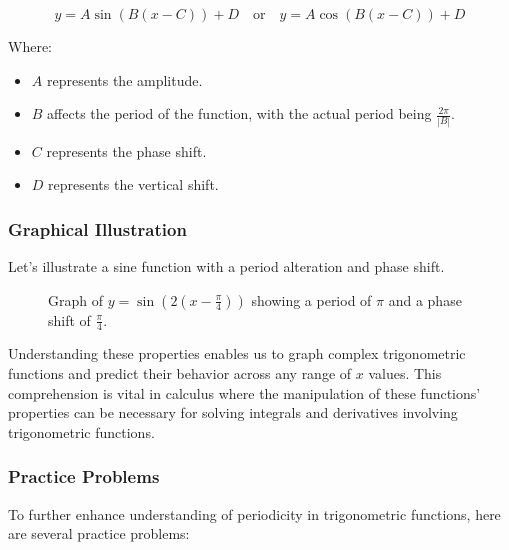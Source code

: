 \documentclass[a4paper,12pt]{book}
\newcounter{problem}
\begin{document}
\[ y = A \sin(B(x - C)) + D \quad \text{or} \quad y = A \cos(B(x - C)) + D \]

Where:
\begin{itemize}
    \item \( A \) represents the amplitude.
    \item \( B \) affects the period of the function, with the actual period being \( \frac{2\pi}{|B|} \).
    \item \( C \) represents the phase shift.
    \item \( D \) represents the vertical shift.
\end{itemize}

\subsubsection*{Graphical Illustration}
Let's illustrate a sine function with a period alteration and phase shift.

\begin{figure}[H]
\centering
{}
\caption{Graph of \( y = \sin(2(x - \frac{\pi}{4})) \) showing a period of \( \pi \) and a phase shift of \( \frac{\pi}{4} \).}
\end{figure}

Understanding these properties enables us to graph complex trigonometric functions and predict their behavior across any range of \( x \) values. This comprehension is vital in calculus where the manipulation of these functions' properties can be necessary for solving integrals and derivatives involving trigonometric functions.

\subsubsection*{Practice Problems}
To further enhance understanding of periodicity in trigonometric functions, here are several practice problems:
\end{document}
